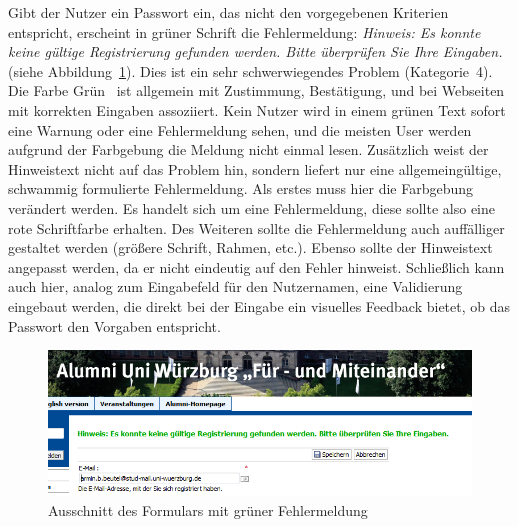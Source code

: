 {
Gibt der Nutzer ein Passwort ein, das nicht den vorgegebenen Kriterien entspricht, erscheint in grüner Schrift die Fehlermeldung: \emph{Hinweis: Es konnte keine gültige Registrierung gefunden werden. Bitte überprüfen Sie Ihre Eingaben.} (siehe Abbildung~\ref{fig:greenerror}).
}
{
Dies ist ein sehr schwerwiegendes Problem (Kategorie~4). Die Farbe \glqq Grün\grqq ~ ist allgemein mit Zustimmung, Bestätigung, und bei Webseiten mit korrekten Eingaben assoziiert. Kein Nutzer wird in einem grünen Text sofort eine Warnung oder eine Fehlermeldung sehen, und die meisten User werden aufgrund der Farbgebung die Meldung nicht einmal lesen. Zusätzlich weist der Hinweistext nicht auf das Problem hin, sondern liefert nur eine allgemeingültige, schwammig formulierte Fehlermeldung.
}
{
Als erstes muss hier die Farbgebung verändert werden. Es handelt sich um eine Fehlermeldung, diese sollte also eine rote Schriftfarbe erhalten. Des Weiteren sollte die Fehlermeldung auch auffälliger gestaltet werden (größere Schrift, Rahmen, etc.). Ebenso sollte der Hinweistext angepasst werden, da er nicht eindeutig auf den Fehler hinweist. Schließlich kann auch hier, analog zum Eingabefeld für den Nutzernamen, eine Validierung eingebaut werden, die direkt bei der Eingabe ein visuelles Feedback bietet, ob das Passwort den Vorgaben entspricht.
}
\label{prob:frei:warntextgruen}

\begin{figure}
	\centering
		\includegraphics[width=\textwidth]{figures/greenerror.png}
	\caption{Ausschnitt des Formulars mit grüner Fehlermeldung}
	\label{fig:greenerror}
\end{figure}

